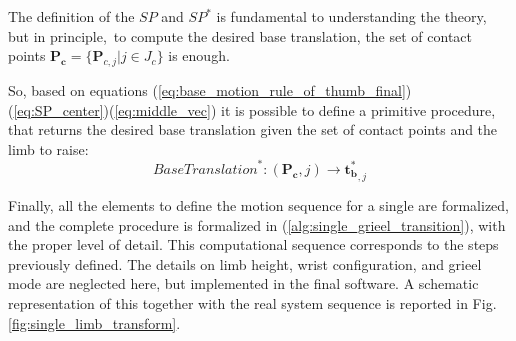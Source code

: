 The definition of the $SP$ and $SP^*$ is fundamental to understanding the theory, but in principle, to compute the desired base translation, the set of contact points $\mathbf{P_c} = \{\mathbf{P}_{c,j} | j\in J_c\}$ is enough. 

So, based on equations (\ref{eq:base_motion_rule_of_thumb_final})(\ref{eq:SP_center})(\ref{eq:middle_vec}) it is possible to define a primitive procedure, that returns the desired base translation given the set of contact points and the limb to raise:
\begin{equation*}
    \textit{BaseTranslation}^*: (\mathbf{{P}_c}, j) \rightarrow \mathbf{t^*_b}_{,j}
\end{equation*}

Finally, all the elements to define the motion sequence for a single are formalized, and the complete procedure is formalized in  (\ref{alg:single_grieel_transition}), with the proper level of detail.
This computational sequence corresponds to the steps previously defined.
The details on limb height, wrist configuration, and grieel mode are neglected here, but implemented in the final software. A schematic representation of this together with the real system sequence is reported in Fig.\ref{fig:single_limb_transform}.

\begin{algorithm}[H]

    \caption{SingleGRIEEL\_Transformation($\mathbf{P_c}$, $j$)}
    \label{alg:single_grieel_transition}
    \begin{algorithmic}[1]
    \ENDIF
    \ENDWHILE
    \ENDWHILE
    \ENDWHILE
    \end{algorithmic}
\end{algorithm} 


